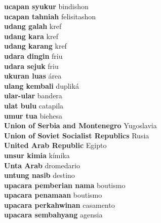 \textbf{ ucapan syukur  } bindishon \\
\textbf{ ucapan tahniah  } felisitashon \\
\textbf{ udang galah  } kref \\
\textbf{ udang kara  } kref \\
\textbf{ udang karang  } kref \\
\textbf{ udara dingin  } friu \\
\textbf{ udara sejuk  } friu \\
\textbf{ ukuran luas  } área \\
\textbf{ ulang kembali  } dupliká \\
\textbf{ ular-ular  } bandera \\
\textbf{ ulat bulu  } catapila \\
\textbf{ umur tua  } biehesa \\
\textbf{ Union of Serbia and Montenegro  } Yugoslavia \\
\textbf{ Union of Soviet Socialist Republics  } Rusia \\
\textbf{ United Arab Republic  } Egipto \\
\textbf{ unsur kimia  } kímika \\
\textbf{ Unta Arab  } dromedario \\
\textbf{ untung nasib  } destino \\
\textbf{ upacara pemberian nama  } boutismo \\
\textbf{ upacara penamaan  } boutismo \\
\textbf{ upacara perkahwinan  } casamento \\
\textbf{ upacara sembahyang  } agensia \\
